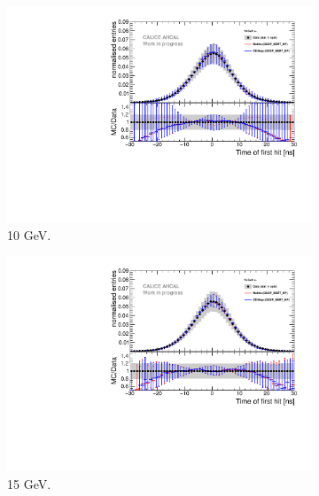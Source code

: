 \begin{figure}[htbp!]
	\begin{subfigure}[t]{0.5\textwidth}
		\centering
		\includegraphics[width=1\textwidth]{../Thesis_Plots/Timing/Electrons/Plots/Comparison_SimData_Electrons10GeV.pdf}
		\caption{10 GeV.}\label{fig:elec_sim_data_10GeV}
	\end{subfigure}
	\hfill
	\begin{subfigure}[t]{0.5\textwidth}
		\centering
		\includegraphics[width=1\textwidth]{../Thesis_Plots/Timing/Electrons/Plots/Comparison_SimData_Electrons15GeV.pdf}
		\caption{15 GeV.}\label{fig:elec_sim_data_15GeV}
	\end{subfigure}
	\hfill
	\begin{subfigure}[t]{0.5\textwidth}
		\centering

\end{subfigure}
\end{figure}
